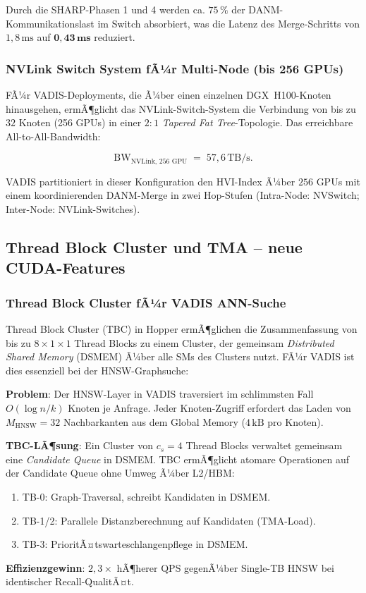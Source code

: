 ﻿\documentclass[12pt,a4paper]{article}
\begin{document}
\noindent Durch die SHARP-Phasen 1 und 4 werden
ca. $75\,\%$ der DANM-Kommunikationslast im Switch absorbiert,
was die Latenz des Merge-Schritts von $1{,}8\,\text{ms}$
auf $\mathbf{0{,}43\,\text{ms}}$ reduziert.

\subsubsection{NVLink Switch System fÃ¼r Multi-Node (bis 256 GPUs)}

FÃ¼r VADIS-Deployments, die Ã¼ber einen einzelnen DGX~H100-Knoten
hinausgehen, ermÃ¶glicht das NVLink-Switch-System die Verbindung
von bis zu $32$ Knoten (256 GPUs) in einer $2{:}1$
\emph{Tapered Fat Tree}-Topologie.
Das erreichbare All-to-All-Bandwidth:

\begin{equation}
  \text{BW}_{\text{NVLink, 256 GPU}} \;=\; 57{,}6\,\text{TB/s}.
\end{equation}

VADIS partitioniert in dieser Konfiguration den HVI-Index Ã¼ber
$256$ GPUs mit einem koordinierenden DANM-Merge in
zwei Hop-Stufen (Intra-Node: NVSwitch; Inter-Node: NVLink-Switches).

\subsection{Thread Block Cluster und TMA -- neue CUDA-Features}
\label{sub:cluster_tma}

\subsubsection{Thread Block Cluster fÃ¼r VADIS ANN-Suche}

Thread Block Cluster (TBC) in Hopper ermÃ¶glichen die
Zusammenfassung von bis zu $8 \times 1 \times 1$ Thread Blocks
zu einem Cluster, der gemeinsam \emph{Distributed Shared Memory}
(DSMEM) Ã¼ber alle SMs des Clusters nutzt.
FÃ¼r VADIS ist dies essenziell bei der HNSW-Graphsuche:

\begin{tcolorbox}[mybox, title={TBC-optimierter HNSW-Scan}]
\small
\textbf{Problem}: Der HNSW-Layer in VADIS traversiert im schlimmsten
Fall $O(\log n/k)$ Knoten je Anfrage. Jeder Knoten-Zugriff
erfordert das Laden von $M_{\text{HNSW}} = 32$ Nachbarkanten
aus dem Global Memory ($4\,\text{kB}$ pro Knoten).

\textbf{TBC-LÃ¶sung}: Ein Cluster von $c_s = 4$ Thread Blocks
verwaltet gemeinsam eine \emph{Candidate Queue} in DSMEM.
TBC ermÃ¶glicht atomare Operationen auf der Candidate Queue
ohne Umweg Ã¼ber L2/HBM:
\begin{enumerate}[leftmargin=1.2em, itemsep=0pt, topsep=2pt]
  \item TB-0: Graph-Traversal, schreibt Kandidaten in DSMEM.
  \item TB-1/2: Parallele Distanzberechnung auf Kandidaten (TMA-Load).
  \item TB-3: PrioritÃ¤tswarteschlangenpflege in DSMEM.
\end{enumerate}
\textbf{Effizienzgewinn}: $2{,}3\times$ hÃ¶herer QPS gegenÃ¼ber
Single-TB HNSW bei identischer Recall-QualitÃ¤t.
\end{tcolorbox}
\end{document}
